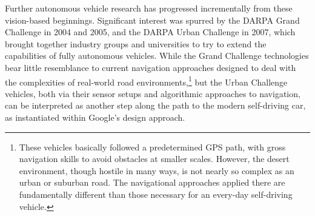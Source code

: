 Further autonomous vehicle research has progressed incrementally from
these vision-based beginnings. Significant interest was spurred by the
DARPA Grand Challenge in 2004 and 2005,\cite{???} and the DARPA Urban Challenge
in 2007, which brought together industry groups and universities to
try to extend the capabilities of fully autonomous vehicles. While the
Grand Challenge technologies bear little resemblance to current
navigation approaches designed to deal with the complexities of
real-world road environments,\footnote{These vehicles basically
  followed a predetermined GPS path, with gross navigation skills to
  avoid obstacles at smaller scales. However, the desert environment,
  though hostile in many ways, is not nearly so complex as an urban or
suburban road. The navigational approaches applied there are
fundamentally different than those necessary for an every-day
self-driving vehicle.} but the Urban Challenge
vehicles, both via their sensor setups and algorithmic approaches to
navigation, can be interpreted as another step along the path to the
modern self-driving car, as instantiated within Google's design approach. 

